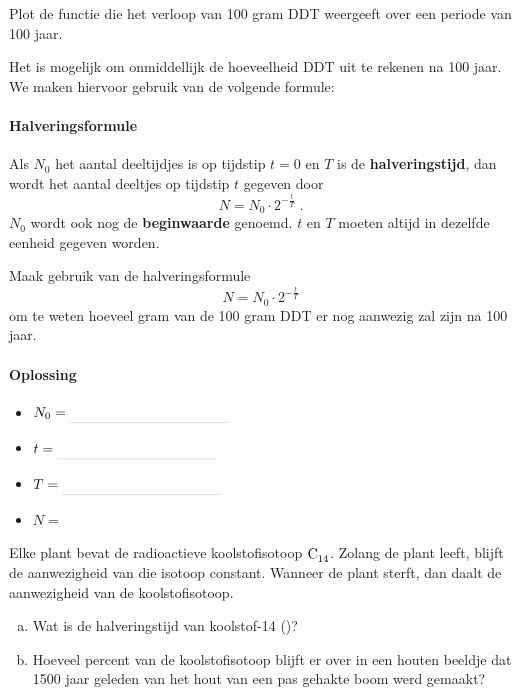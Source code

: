 \documentclass[12pt,twoside]{article}
\begin{document}
\begin{oefening}
Plot de functie die het verloop van 100 gram DDT  weergeeft over een periode van 100 jaar.
\begin{center}
\visgraad{12cm}
\end{center}
\end{oefening}

Het is mogelijk om onmiddellijk de hoeveelheid DDT uit te rekenen na 100 jaar. We maken hiervoor gebruik van de volgende formule:

\paragraph*{Halveringsformule}
\begin{mdframed}
Als $N_0$ het aantal deeltijdjes is op tijdstip $t=0$ en $T$ is de {\bf halveringstijd}, dan wordt het aantal deeltjes op tijdstip $t$ gegeven door
$$N=N_0\cdot2^{-\frac{t}{T}}\;.$$
$N_0$ wordt ook nog de {\bf beginwaarde} genoemd. $t$ en $T$ moeten altijd in dezelfde eenheid gegeven worden.
\end{mdframed}

\begin{oefening}
Maak gebruik van de halveringsformule
$$N=N_0\cdot2^{-\frac{t}{T}}$$
om te weten hoeveel gram van de 100 gram DDT er nog aanwezig zal zijn na 100 jaar.
\paragraph*{Oplossing}
\begin{itemize}
  \itemsep1em
  \item $N_0=\arule{4cm}$
  \item $t = \arule{4cm}$
  \item $T = \arule{4cm}$
  \item $N = $ \arulefill
\end{itemize}
\end{oefening}

\begin{oefening}
Elke plant bevat de radioactieve koolstofisotoop $\ce{C14}$. Zolang de plant leeft, blijft de aanwezigheid van die isotoop constant. Wanneer de plant sterft, dan daalt de aanwezigheid van de koolstofisotoop.
\begin{enumerate}[(a)]
  \item Wat is de halveringstijd van koolstof-14 ()?
  \item Hoeveel percent van de koolstofisotoop  blijft er over in een houten beeldje dat 1500 jaar geleden van het hout van een pas gehakte boom werd gemaakt?
\end{enumerate}
\end{oefening}
\end{document}
